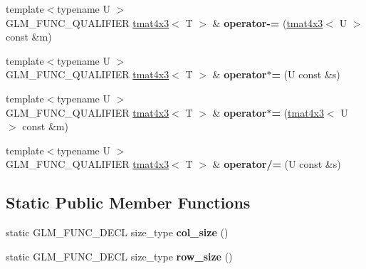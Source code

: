 \begin{DoxyCompactItemize}
\item 
\hypertarget{structglm_1_1detail_1_1tmat4x3_a70944158c7c42121d850a84b74266a84}{{\footnotesize template$<$typename U $>$ }\\G\-L\-M\-\_\-\-F\-U\-N\-C\-\_\-\-Q\-U\-A\-L\-I\-F\-I\-E\-R \hyperlink{structglm_1_1detail_1_1tmat4x3}{tmat4x3}$<$ T $>$ \& {\bfseries operator-\/=} (\hyperlink{structglm_1_1detail_1_1tmat4x3}{tmat4x3}$<$ U $>$ const \&m)}\label{structglm_1_1detail_1_1tmat4x3_a70944158c7c42121d850a84b74266a84}

\item 
\hypertarget{structglm_1_1detail_1_1tmat4x3_a7e1e8035a12bbcce5b1a4b92185ec47a}{{\footnotesize template$<$typename U $>$ }\\G\-L\-M\-\_\-\-F\-U\-N\-C\-\_\-\-Q\-U\-A\-L\-I\-F\-I\-E\-R \hyperlink{structglm_1_1detail_1_1tmat4x3}{tmat4x3}$<$ T $>$ \& {\bfseries operator$\ast$=} (U const \&s)}\label{structglm_1_1detail_1_1tmat4x3_a7e1e8035a12bbcce5b1a4b92185ec47a}

\item 
\hypertarget{structglm_1_1detail_1_1tmat4x3_a572275f4bfe479047ff4429ac26c08e8}{{\footnotesize template$<$typename U $>$ }\\G\-L\-M\-\_\-\-F\-U\-N\-C\-\_\-\-Q\-U\-A\-L\-I\-F\-I\-E\-R \hyperlink{structglm_1_1detail_1_1tmat4x3}{tmat4x3}$<$ T $>$ \& {\bfseries operator$\ast$=} (\hyperlink{structglm_1_1detail_1_1tmat4x3}{tmat4x3}$<$ U $>$ const \&m)}\label{structglm_1_1detail_1_1tmat4x3_a572275f4bfe479047ff4429ac26c08e8}

\item 
\hypertarget{structglm_1_1detail_1_1tmat4x3_a656606e11ae0cb9d0a9cf0c8203604e7}{{\footnotesize template$<$typename U $>$ }\\G\-L\-M\-\_\-\-F\-U\-N\-C\-\_\-\-Q\-U\-A\-L\-I\-F\-I\-E\-R \hyperlink{structglm_1_1detail_1_1tmat4x3}{tmat4x3}$<$ T $>$ \& {\bfseries operator/=} (U const \&s)}\label{structglm_1_1detail_1_1tmat4x3_a656606e11ae0cb9d0a9cf0c8203604e7}

\end{DoxyCompactItemize}
\subsection*{Static Public Member Functions}
\begin{DoxyCompactItemize}
\item 
\hypertarget{structglm_1_1detail_1_1tmat4x3_a4d265b380e0ffcd9c22160ec0aa0174f}{static G\-L\-M\-\_\-\-F\-U\-N\-C\-\_\-\-D\-E\-C\-L size\-\_\-type {\bfseries col\-\_\-size} ()}\label{structglm_1_1detail_1_1tmat4x3_a4d265b380e0ffcd9c22160ec0aa0174f}

\item 
\hypertarget{structglm_1_1detail_1_1tmat4x3_a43233b7dcbaaf896a036ca122d5e084e}{static G\-L\-M\-\_\-\-F\-U\-N\-C\-\_\-\-D\-E\-C\-L size\-\_\-type {\bfseries row\-\_\-size} ()}\label{structglm_1_1detail_1_1tmat4x3_a43233b7dcbaaf896a036ca122d5e084e}

\end{DoxyCompactItemize}


